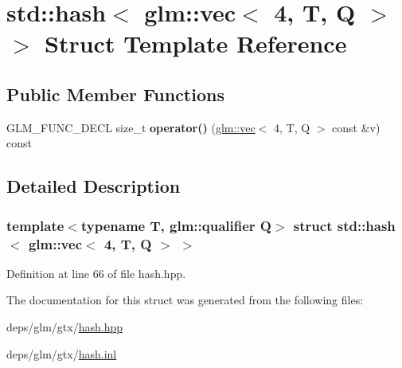 \hypertarget{structstd_1_1hash_3_01glm_1_1vec_3_014_00_01T_00_01Q_01_4_01_4}{}\section{std\+:\+:hash$<$ glm\+:\+:vec$<$ 4, T, Q $>$ $>$ Struct Template Reference}
\label{structstd_1_1hash_3_01glm_1_1vec_3_014_00_01T_00_01Q_01_4_01_4}
\subsection*{Public Member Functions}
\begin{DoxyCompactItemize}
\item 
\mbox{\label{structstd_1_1hash_3_01glm_1_1vec_3_014_00_01T_00_01Q_01_4_01_4_a72e371757a7547477bfb3d73f584b0b9}} 
G\+L\+M\+\_\+\+F\+U\+N\+C\+\_\+\+D\+E\+CL size\+\_\+t {\bfseries operator()} (\hyperlink{structglm_1_1vec}{glm\+::vec}$<$ 4, T, Q $>$ const \&v) const
\end{DoxyCompactItemize}


\subsection{Detailed Description}
\subsubsection*{template$<$typename T, glm\+::qualifier Q$>$\newline
struct std\+::hash$<$ glm\+::vec$<$ 4, T, Q $>$ $>$}



Definition at line 66 of file hash.\+hpp.



The documentation for this struct was generated from the following files\+:\begin{DoxyCompactItemize}
\item 
deps/glm/gtx/\hyperlink{hash_8hpp}{hash.\+hpp}\item 
deps/glm/gtx/\hyperlink{hash_8inl}{hash.\+inl}\end{DoxyCompactItemize}

